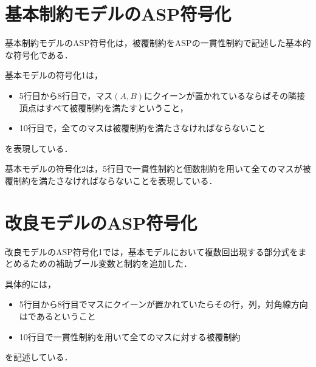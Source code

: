 \section{基本制約モデルのASP符号化}
基本制約モデルのASP符号化は，被覆制約をASPの一貫性制約で記述した基本的な符号化である．



基本モデルの符号化1は，
\begin{itemize}
 \item 5行目から8行目で，マス$(A,B)$にクイーンが置かれているならばその隣接頂点はすべて被覆制約を満たすということ，
 \item 10行目で，全てのマスは被覆制約を満たさなければならないこと
\end{itemize}
を表現している．

\newpage



基本モデルの符号化2は，5行目で一貫性制約と個数制約を用いて全てのマスが被覆制約を満たさなければならないことを表現している．
\newpage
\section{改良モデルのASP符号化}


改良モデルのASP符号化1では，基本モデルにおいて複数回出現する部分式をまとめるための補助ブール変数と制約を追加した．\par
具体的には，\begin{itemize}
	     \item 5行目から8行目でマスにクイーンが置かれていたらその行，列，対角線方向はであるということ
	     \item 10行目で一貫性制約を用いて全てのマスに対する被覆制約
	    \end{itemize}
を記述している．



